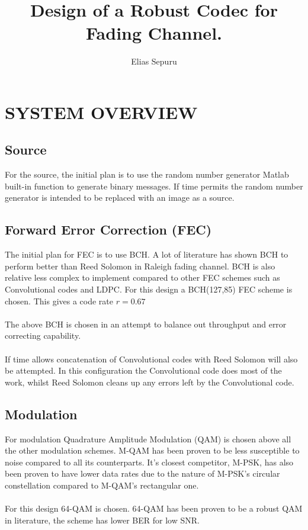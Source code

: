 \documentclass[]{article}
\title{Design of a Robust Codec for Fading Channel.}
\author{Elias Sepuru}
\begin{document}
\maketitle



\section*{SYSTEM OVERVIEW}

\subsection*{Source}
For the source, the initial plan is to use the random number generator Matlab built-in function to generate binary messages. If time permits the random number generator is intended to be replaced with an image as a source.

\subsection*{Forward Error Correction (FEC)}
The initial plan for FEC is to use BCH. A lot of literature has shown BCH to perform better than Reed Solomon in Raleigh fading channel. BCH is also relative less complex to implement compared to other FEC schemes such as Convolutional codes and LDPC. For this design a BCH(127,85) FEC scheme is chosen. This gives a code rate $r = 0.67$
\\
\\
The above BCH is chosen in an attempt to balance out throughput and error correcting capability.
\\
\\
If time allows concatenation of Convolutional codes with Reed Solomon will also be attempted. In this configuration the Convolutional code does most of the work, whilst Reed Solomon cleans up any errors left by  the Convolutional code. 

\subsection*{Modulation}
For modulation Quadrature Amplitude Modulation (QAM) is chosen above all the other modulation schemes. M-QAM has been proven to be less susceptible to noise compared to all its counterparts. It's closest competitor, M-PSK, has also been proven to have lower data rates due to the nature of M-PSK's circular constellation compared to M-QAM's rectangular one.
\\
\\
For this design 64-QAM is chosen. 64-QAM has been proven to be a robust QAM in literature, the scheme has lower BER for low SNR.
\end{document}
